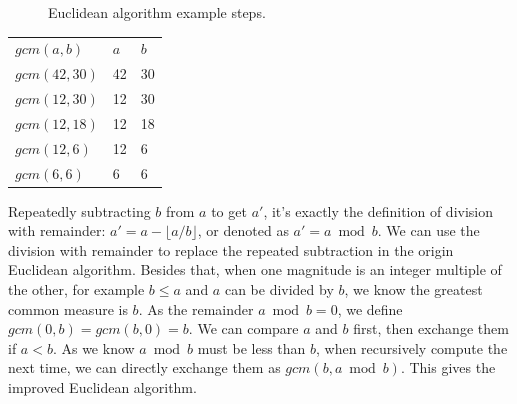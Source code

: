 \documentclass{article}
\begin{document}
\begin{figure}[htbp]
\centering
{}
\caption{Euclidean algorithm example steps.}
\label{fig:line-seg-gcm}
\end{figure}

\begin{tabular}{|l|l|l|}
\hline
$gcm(a, b)$ & $a$ & $b$ \\
\hhline{|=|=|=|}
$gcm(42, 30)$ & 42 & 30 \\
\hline
$gcm(12, 30)$ & 12 & 30 \\
\hline
$gcm(12, 18)$ & 12 & 18 \\
\hline
$gcm(12, 6)$ & 12 & 6 \\
\hline
$gcm(6, 6)$ & 6 & 6 \\
\hline
\end{tabular}

Repeatedly subtracting $b$ from $a$ to get $a'$, it's exactly the definition of division with remainder: $a' = a - \lfloor a / b \rfloor$, or denoted as $a'= a \bmod b$. We can use the division with remainder to replace the repeated subtraction in the origin Euclidean algorithm. Besides that, when one magnitude is an integer multiple of the other, for example $b \leq a$ and $a$ can be divided by $b$, we know the greatest common measure is $b$. As the remainder $a \bmod b = 0$, we define $gcm(0, b) = gcm(b, 0) = b$. We can compare $a$ and $b$ first, then exchange them if $a < b$. As we know $a \bmod b$ must be less than $b$, when recursively compute the next time, we can directly exchange them as $gcm(b, a \bmod b)$. This gives the improved Euclidean algorithm.
\end{document}
